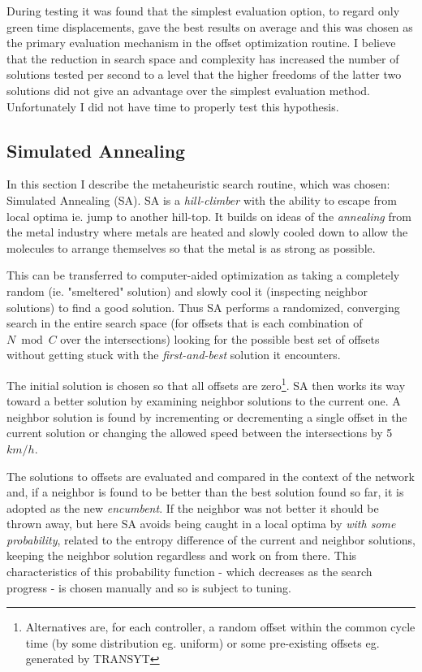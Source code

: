 During testing it was found that the simplest evaluation option, to regard only green time displacements, gave the best results on average and this was chosen as the primary evaluation mechanism in the offset optimization routine. I believe that the reduction in search space and complexity has increased the number of solutions tested per second to a level that the higher freedoms of the latter two solutions did not give an advantage over the simplest evaluation method. Unfortunately I did not have time to properly test this hypothesis.

\subsection{Simulated Annealing}
\label{siman}
In this section I describe the metaheuristic search routine, which was chosen: Simulated Annealing (SA). 
SA is a \textit{hill-climber} with the ability to escape from local optima ie. jump to another hill-top. It builds on ideas of the \textit{annealing} from the metal industry where metals are heated and slowly cooled down to allow the molecules to arrange themselves so that the metal is as strong as possible.

This can be transferred to computer-aided optimization as taking a completely random (ie. "smeltered" solution) and slowly cool it (inspecting neighbor solutions) to find a good solution. Thus SA performs a randomized, converging search in the entire search space (for offsets that is each combination of $N \bmod C$ over the intersections) looking for the possible best set of offsets without getting stuck with the \textit{first-and-best} solution it encounters.

The initial solution is chosen so that all offsets are zero\footnote{Alternatives are, for each controller, a random offset within the common cycle time (by some distribution eg. uniform) or some pre-existing offsets eg. generated by TRANSYT}. SA then works its way toward a better solution by examining neighbor solutions to the current one. A neighbor solution is found by incrementing or decrementing a single offset in the current solution or changing the allowed speed between the intersections by 5$km/h$.

The solutions to offsets are evaluated and compared in the context of the network and, if a neighbor is found to be better than the best solution found so far, it is adopted as the new \textit{encumbent}. If the neighbor was not better it should be thrown away, but here SA avoids being caught in a local optima by \textit{with some probability}, related to the entropy difference of the current and neighbor solutions, keeping the neighbor solution regardless and work on from there. This characteristics of this probability function - which decreases as the search progress  - is chosen manually and so is subject to tuning.

